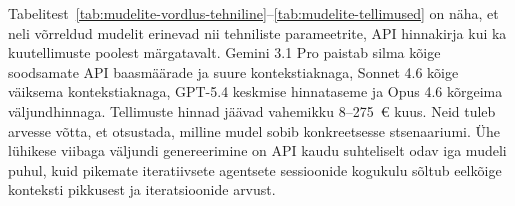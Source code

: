 Tabelitest~\ref{tab:mudelite-vordlus-tehniline}--\ref{tab:mudelite-tellimused} on näha, et neli võrreldud mudelit erinevad nii tehniliste parameetrite, API hinnakirja kui ka kuutellimuste poolest märgatavalt. Gemini 3.1 Pro paistab silma kõige soodsamate API baasmäärade ja suure kontekstiaknaga, Sonnet 4.6 kõige väiksema kontekstiaknaga, GPT-5.4 keskmise hinnataseme ja Opus 4.6 kõrgeima väljundhinnaga. Tellimuste hinnad jäävad vahemikku 8--275~€ kuus. Neid tuleb arvesse võtta, et otsustada, milline mudel sobib konkreetsesse stsenaariumi. Ühe lühikese viibaga väljundi genereerimine on API kaudu suhteliselt odav iga mudeli puhul, kuid pikemate iteratiivsete agentsete sessioonide kogukulu sõltub eelkõige konteksti pikkusest ja iteratsioonide arvust.
